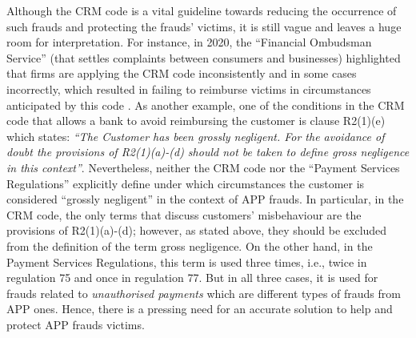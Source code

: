 Although the CRM code is a vital guideline  towards reducing the occurrence of such frauds and protecting  the frauds' victims, it is still  vague and leaves a huge room for interpretation. For instance, in 2020, the ``Financial Ombudsman Service'' (that settles complaints between consumers and businesses)  highlighted that firms  are applying the CRM code inconsistently and in some cases incorrectly, which resulted in failing to reimburse victims in circumstances anticipated by this code \cite{Financial-Ombudsman-Service-response}.  As another example, one of the conditions in the CRM code that allows a bank to avoid reimbursing the customer is clause R2(1)(e) which states: \textit{``The Customer has been grossly negligent. For the avoidance of doubt the provisions of R2(1)(a)-(d) should not be taken to define gross negligence in this context''}.  Nevertheless, neither the CRM code  nor the ``Payment Services Regulations'' \cite{Regulations}   explicitly define under which circumstances the customer is considered ``grossly negligent'' in the context of  APP frauds. In particular, in the CRM code, the only terms that discuss customers' misbehaviour are  the provisions of R2(1)(a)-(d); however, as stated above, they should be excluded from the definition of the term gross negligence. On the  other hand,  in the Payment Services Regulations, this term is used three times, i.e.,  twice in regulation 75 and once in regulation 77. But in all  three cases, it is used for frauds related to \emph{unauthorised payments} which are  different types of frauds from  APP ones. Hence, there is a pressing need for an accurate solution to help and protect  APP frauds victims. 



